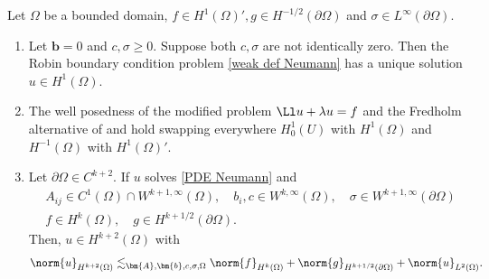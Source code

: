 \documentclass[
    a4paper,
    DIV=14,
    abstract=true,
    numbers=noenddot
]{scrartcl}
\begin{document}
\begin{theorem}
    Let $\Omega $ be a bounded domain, $f \in H^{1}(\Omega )', g \in H^{-1/2}( \partial \Omega )$ and $\sigma \in L^\infty(\partial \Omega )$.
    \begin{enumerate}
        \item Let $\bm{b}=0$ and $c, \sigma  \geq 0$. Suppose both $c, \sigma $  are not identically zero. Then the Robin boundary condition problem \eqref{weak def Neumann} has a unique solution $u \in H^1(\Omega )$.
        \item The well posedness of the modified problem $\Ll u + \lambda u=f$ and the Fredholm alternative of  and  hold swapping everywhere $H_0^1(U)$ with $H^1(\Omega )$ and $H^{-1}(\Omega )$ with $H^{1}(\Omega )'$.
        \item Let $\partial \Omega \in C^{k+2}$. If $u$ solves \eqref{PDE Neumann} and
              \begin{align*}
                   & A_{ij} \in C^{1}(\Omega )\cap W^{k+1, \infty}(\Omega ), \quad b_i,c \in W^{k, \infty}(\Omega ), \quad \sigma \in W^{k+1, \infty}(\partial \Omega ) \\
                   & f \in H^{k}(\Omega ), \quad g \in H^{k+1/2}(\partial \Omega ).
              \end{align*}
              Then, $u \in H^{k+2}(\Omega )$ with
              \begin{align*}
                  \norm{u}_{H^{k+2}(\Omega )} \lesssim_{\bm{A},\bm{b},c, \sigma,  \Omega } \norm{f}_{H^k(\Omega )}+\norm{g}_{H^{k+1/2}(\partial \Omega )}+\norm{u}_{L^2(\Omega )}.
              \end{align*}
    \end{enumerate}
\end{theorem}
\end{document}
